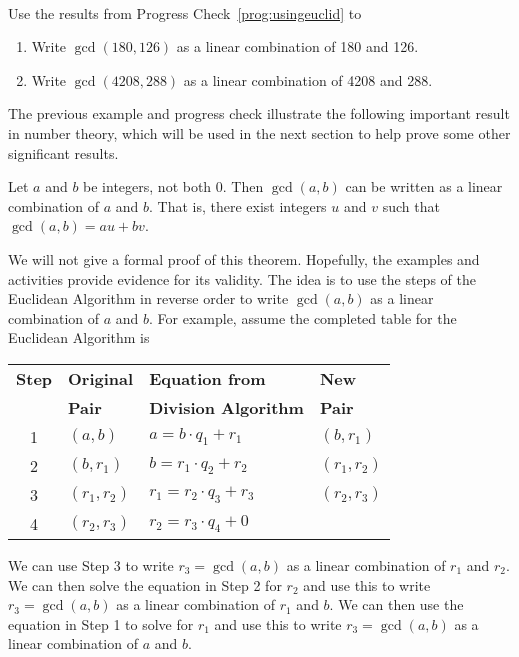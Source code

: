 %
\begin{prog}\label{prog:gcdaslincomb} \hfill \\ 
Use the results from Progress Check~\ref{prog:usingeuclid} to
\begin{enumerate}
\item Write  $\gcd( {180, 126} )$  as a linear combination of  180  and  126.

\item Write  $\gcd( {4208, 288} )$  as a linear combination of  4208  and  288.
\end{enumerate}
\end{prog}
\hbreak
%
The previous example and progress check illustrate the following important result in number theory, which will be used in the next section to help prove some other significant results.
%
\begin{theorem}\label{T:gcdaslincomb}
Let  $a$  and  $b$  be integers, not both  0.  Then  $\gcd( {a, b} )$
 can be written as a linear combination of  $a$  and  $b$.  That is, there exist integers  $u$  and  $v$  such that  $\gcd( {a, b} ) = au + bv$.
\end{theorem}
%
We will not give a formal proof of this theorem.  Hopefully, the examples and activities provide evidence for its validity.  The idea is to use the steps of the Euclidean Algorithm in reverse order to write  $\gcd( {a, b} )$  as a linear combination of  $a$  and  $b$.  For example, assume the completed table for the Euclidean Algorithm is

\begin{center}
\begin{tabular}[h]{| c | l | l | l |}
  \hline
\textbf{Step} & \textbf{Original}  &  \textbf{Equation from}  &    \textbf{New}    \\
  & \textbf{Pair}     &  \textbf{Division Algorithm}  &    \textbf{Pair}  \\ \hline
1 & $\left( {a, b} \right)$  &  	$a = b \cdot q_1  + r_1 $  &  $\left( {b, r_1 } \right)$  \\ \hline
2 & $\left( {b, r_1 } \right)$  &  $b = r_1  \cdot q_2  + r_2 $  &  $\left( {r_1 , r_2 } \right)$  \\ \hline
3 & $\left( {r_1 , r_2 } \right)$  &  $r_1  = r_2  \cdot q_3  + r_3$   &	$\left( {r_2 , r_3 } \right)$  \\ \hline
4 & $\left( {r_2 , r_3 } \right)$  &  $r_2  = r_3  \cdot q_4  + 0 $  &    \\ \hline
\end{tabular}
\end{center}
%
We can use Step 3 to write  $r_3  = \gcd( {a, b} )$ as a linear combination of  
$r_1 $  and  $r_2 $.  We can then solve the equation in Step 2 for  $r_2 $ and use this to write  $r_3  = \gcd( {a, b} )$ as a linear combination of  $r_1 $  and  $b$.  We can then use the equation in Step 1 to solve for  $r_1 $  and use this to write  
$r_3  = \gcd( {a, b} )$  as a linear combination of  $a$  and  $b$.  

